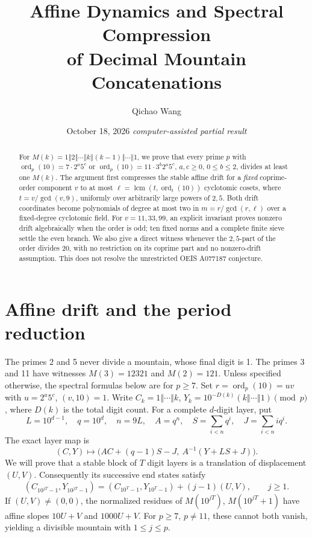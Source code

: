 \documentclass[10pt]{article}
\title{Affine Dynamics and Spectral Compression\\
of Decimal Mountain Concatenations}
\author{Qichao Wang}
\date{October 18, 2026 \quad \textit{computer-assisted partial result}}
\DeclareMathOperator{\ord}{ord}
\newcommand{\cat}{\mathbin{\Vert}}
\begin{document}
\maketitle
\begin{abstract}
For \(M(k)=1\cat2\cat\cdots\cat k\cat(k-1)\cat\cdots\cat1\),
we prove that every prime \(p\) with
\(\ord_p(10)=7\cdot2^a5^c\) or
\(\ord_p(10)=11\cdot3^b2^a5^c\), \(a,c\ge0\), \(0\le b\le2\),
divides at least one \(M(k)\).
The argument first compresses the stable affine drift for a
\emph{fixed} coprime-order component \(v\) to at most
\(\ell=\operatorname{lcm}(t,\ord_t(10))\) cyclotomic cosets,
where \(t=v/\gcd(v,9)\),
uniformly over arbitrarily large powers of \(2,5\).
Both drift coordinates become polynomials of degree at most two
in \(m=r/\gcd(r,\ell)\) over a fixed-degree cyclotomic field.
For \(v=11,33,99\), an explicit invariant proves nonzero drift
algebraically when the order is odd; ten fixed norms and a complete
finite sieve settle the even branch. We also give a direct witness
whenever the \(2,5\)-part of the order divides 20, with no restriction
on its coprime part and no nonzero-drift assumption.
This does not resolve the unrestricted OEIS A077187 conjecture.
\end{abstract}

\section{Affine drift and the period reduction}
The primes 2 and 5 never divide a mountain, whose final digit is 1.
The primes 3 and 11 have witnesses \(M(3)=12321\) and \(M(2)=121\).
Unless specified otherwise, the spectral formulas below are for
\(p\ge7\). Set \(r=\ord_p(10)=uv\) with
\(u=2^a5^c\), \((v,10)=1\).
Write \(C_k=1\cat\cdots\cat k\),
\(Y_k=10^{-D(k)}(k\cat\cdots\cat1)\pmod p\),
where \(D(k)\) is the total digit count.
For a complete \(d\)-digit layer, put
\[
L=10^{d-1},\quad q=10^d,\quad n=9L,\quad A=q^n,
\quad S=\sum_{i<n}q^i,\quad J=\sum_{i<n}iq^i.
\]
The exact layer map is
\[
(C,Y)\longmapsto\bigl(AC+(q-1)S-J,\
A^{-1}(Y+LS+J)\bigr).
\]
We will prove that a stable block of \(T\) digit layers is a translation
of displacement \((U,V)\). Consequently its successive end states satisfy
\[
(C_{10^{jT}-1},Y_{10^{jT}-1})
=(C_{10^T-1},Y_{10^T-1})+(j-1)(U,V),\qquad j\ge1.
\]
If \((U,V)\ne(0,0)\), the normalized residues of
\(M(10^{jT})\), \(M(10^{jT}+1)\) have affine slopes
\(10U+V\) and \(1000U+V\). For \(p\ge7\), \(p\ne11\),
these cannot both vanish, yielding a divisible mountain with
\(1\le j\le p\).
\end{document}
